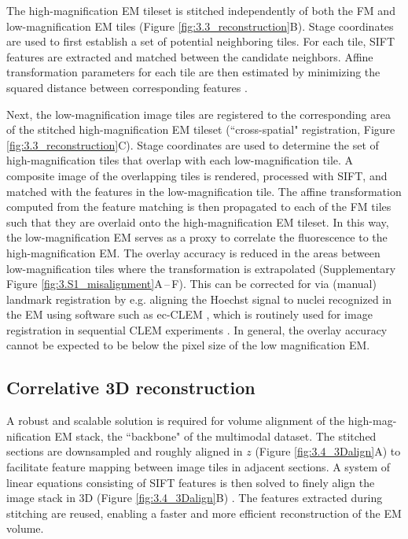 The high-magnification EM tileset is stitched independently of both the FM and low-magnification EM tiles (Figure \ref{fig:3.3_reconstruction}B). Stage coordinates are used to first establish a set of potential neighboring tiles. For each tile, SIFT features are extracted and matched between the candidate neighbors. Affine transformation parameters for each tile are then estimated by minimizing the squared distance between corresponding features \cite{saalfeld2012elastic, khairy2018joint}.

Next, the low-magnification image tiles are registered to the corresponding area of the stitched high-magnification EM tileset (``cross-spatial" registration, Figure \ref{fig:3.3_reconstruction}C). Stage coordinates are used to determine the set of high-magnification tiles that overlap with each low-magnification tile. A composite image of the overlapping tiles is rendered, processed with SIFT, and matched with the features in the low-magnification tile. The affine transformation computed from the feature matching is then propagated to each of the FM tiles such that they are overlaid onto the high-magnification EM tileset. In this way, the low-magnification EM serves as a proxy to correlate the fluorescence to the high-magnification EM. The overlay accuracy is reduced in the areas between low-magnification tiles where the transformation is extrapolated (Supplementary Figure \ref{fig:3.S1_misalignment}A\,--\,F). This can be corrected for via (manual) landmark registration by e.g. aligning the Hoechst signal to nuclei recognized in the EM using software such as ec-CLEM \cite{paul2017ec}, which is routinely used for image registration in sequential CLEM experiments \cite{franke2019correlative, tuijtel2019correlative, lee2020selective}. In general, the overlay accuracy cannot be expected to be below the pixel size of the low magnification EM.


\subsection{Correlative 3D reconstruction}
\label{sec:3R_3Dalign}
A robust and scalable solution is required for volume alignment of the high-mag-nification EM stack, the ``backbone" of the multimodal dataset. The stitched sections are downsampled and roughly aligned in $z$ (Figure \ref{fig:3.4_3Dalign}A) to facilitate feature mapping between image tiles in adjacent sections. A system of linear equations consisting of SIFT features is then solved to finely align the image stack in 3D (Figure \ref{fig:3.4_3Dalign}B) \cite{khairy2018joint}. The features extracted during stitching are reused, enabling a faster and more efficient reconstruction of the EM volume.


